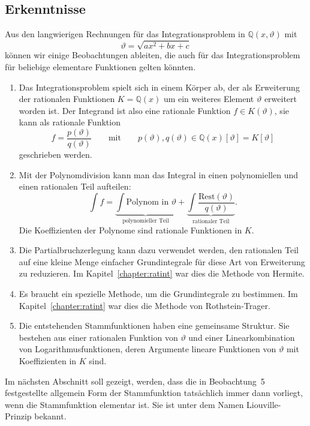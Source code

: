 %
%
%
\subsection{Erkenntnisse}
Aus den langwierigen Rechnungen für das Integrationsproblem in
$\mathbb{Q}(x,\vartheta)$ mit
\[
\vartheta=\!\sqrt{ax^2+bx+c}
\]
können wir einige Beobachtungen ableiten,
die auch für das Integrationsproblem für beliebige elementare
Funktionen gelten könnten.
\begin{enumerate}
\item 
Das Integrationsproblem spielt sich in einem Körper ab, der als
Erweiterung der rationalen Funktionen $K=\mathbb{Q}(x)$ um ein weiteres 
Element $\vartheta$ erweitert worden ist.
Der Integrand ist also eine rationale Funktion $f\in K(\vartheta)$, sie
kann als rationale Funktion 
\[
f
=
\frac{p(\vartheta)}{q(\vartheta)}
\qquad
\text{mit}
\qquad
p(\vartheta),q(\vartheta)
\in
\mathbb{Q}(x)[\vartheta]
=
K[\vartheta]
\]
geschrieben werden.
\item
Mit der Polynomdivision kann man das Integral in einen polynomiellen
und einen rationalen Teil aufteilen:
\[
\int f
=
\underbrace{
\int \text{Polynom in $\vartheta$}
}_{
\displaystyle\text{polynomieller Teil}
}
+
\underbrace{
\int\frac{\text{Rest}(\vartheta)}{q(\vartheta)}
}_{
\displaystyle\text{rationaler Teil}
}.
\]
Die Koeffizienten der Polynome sind rationale Funktionen in $K$.
\item
Die Partialbruchzerlegung kann dazu verwendet werden, den rationalen
Teil auf eine kleine Menge einfacher Grundintegrale für diese
Art von Erweiterung zu reduzieren.
Im Kapitel~\ref{chapter:ratint} war dies die Methode von Hermite.
\item
Es braucht ein spezielle Methode, um die Grundintegrale zu bestimmen.
Im Kapitel~\ref{chapter:ratint} war dies die Methode von Rothstein-Trager.
\item
Die entstehenden Stammfunktionen haben eine gemeinsame Struktur.
Sie bestehen aus einer rationalen Funktion von $\vartheta$ und
einer Linearkombination von Logarithmusfunktionen, deren Argumente
lineare Funktionen von $\vartheta$ mit Koeffizienten in $K$ sind.
\end{enumerate}
Im nächsten Abschnitt soll gezeigt, werden, dass die in Beobachtung~5
festgestellte allgemein Form der Stammfunktion tatsächlich 
immer dann vorliegt, wenn die Stammfunktion elementar ist.
Sie ist unter dem Namen Liouville-Prinzip bekannt.



